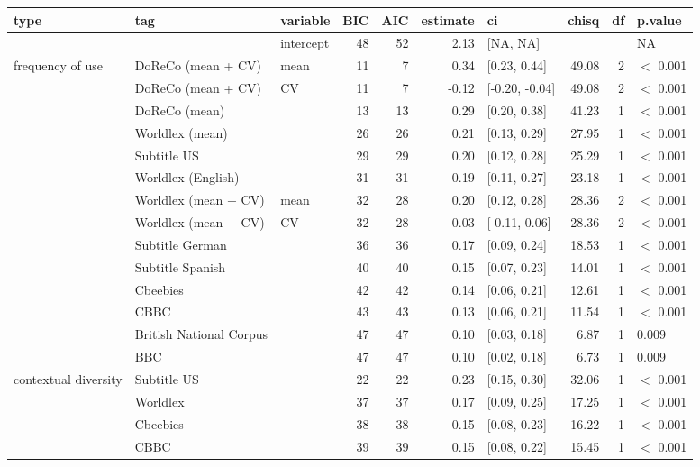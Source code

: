 \begin{table}[ht]
\centering
\begin{tabular}{lllrrrlrrl}
  \hline
type & tag & variable & BIC & AIC & estimate & ci & chisq & df & p.value \\ 
  \hline
 &  & intercept & 48 & 52 & 2.13 & [NA, NA] &  &  & NA \\ 
  frequency of use & DoReCo (mean + CV) & mean & 11 & 7 & 0.34 & [0.23, 0.44] & 49.08 & 2 & $<$ 0.001 \\ 
   & DoReCo (mean + CV) & CV & 11 & 7 & -0.12 & [-0.20, -0.04] & 49.08 & 2 & $<$ 0.001 \\ 
   & DoReCo (mean) &  & 13 & 13 & 0.29 & [0.20, 0.38] & 41.23 & 1 & $<$ 0.001 \\ 
   & Worldlex (mean) &  & 26 & 26 & 0.21 & [0.13, 0.29] & 27.95 & 1 & $<$ 0.001 \\ 
   & Subtitle US &  & 29 & 29 & 0.20 & [0.12, 0.28] & 25.29 & 1 & $<$ 0.001 \\ 
   & Worldlex (English) &  & 31 & 31 & 0.19 & [0.11, 0.27] & 23.18 & 1 & $<$ 0.001 \\ 
   & Worldlex (mean + CV) & mean & 32 & 28 & 0.20 & [0.12, 0.28] & 28.36 & 2 & $<$ 0.001 \\ 
   & Worldlex (mean + CV) & CV & 32 & 28 & -0.03 & [-0.11, 0.06] & 28.36 & 2 & $<$ 0.001 \\ 
   & Subtitle German &  & 36 & 36 & 0.17 & [0.09, 0.24] & 18.53 & 1 & $<$ 0.001 \\ 
   & Subtitle Spanish &  & 40 & 40 & 0.15 & [0.07, 0.23] & 14.01 & 1 & $<$ 0.001 \\ 
   & Cbeebies &  & 42 & 42 & 0.14 & [0.06, 0.21] & 12.61 & 1 & $<$ 0.001 \\ 
   & CBBC &  & 43 & 43 & 0.13 & [0.06, 0.21] & 11.54 & 1 & $<$ 0.001 \\ 
   & British National Corpus &  & 47 & 47 & 0.10 & [0.03, 0.18] & 6.87 & 1 & 0.009 \\ 
   & BBC &  & 47 & 47 & 0.10 & [0.02, 0.18] & 6.73 & 1 & 0.009 \\ 
  contextual diversity & Subtitle US &  & 22 & 22 & 0.23 & [0.15, 0.30] & 32.06 & 1 & $<$ 0.001 \\ 
   & Worldlex &  & 37 & 37 & 0.17 & [0.09, 0.25] & 17.25 & 1 & $<$ 0.001 \\ 
   & Cbeebies &  & 38 & 38 & 0.15 & [0.08, 0.23] & 16.22 & 1 & $<$ 0.001 \\ 
   & CBBC &  & 39 & 39 & 0.15 & [0.08, 0.22] & 15.45 & 1 & $<$ 0.001 \\ 

\end{tabular}
\end{table}
